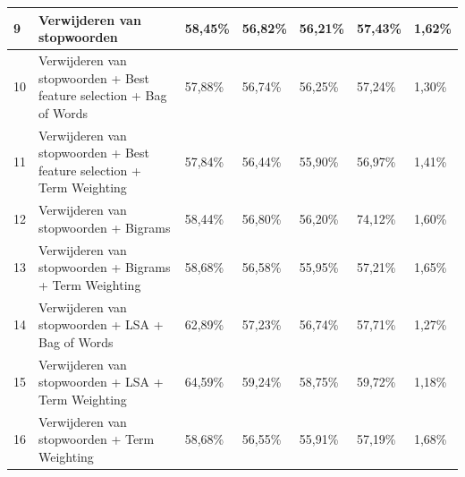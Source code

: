 \begin{table}
\begin{adjustbox}{width=1\textwidth}
\begin{tabular}{|l|l|l|l|l|l|l|}
9        & Verwijderen van stopwoorden                                                      & 58,45\%                     & 56,82\%                & 56,21\%                 & 57,43\%                  & 1,62\%      \\ \hline
10       & Verwijderen van stopwoorden + Best feature selection + Bag of Words   & 57,88\%                     & 56,74\%                & 56,25\%                 & 57,24\%                  & 1,30\%      \\ \hline
11       & Verwijderen van stopwoorden + Best feature selection + Term Weighting & 57,84\%                     & 56,44\%                & 55,90\%                 & 56,97\%                  & 1,41\%      \\ \hline
12       & Verwijderen van stopwoorden + Bigrams                                            & 58,44\%                     & 56,80\%                & 56,20\%                 & 74,12\%                  & 1,60\%      \\ \hline
13       & Verwijderen van stopwoorden + Bigrams + Term Weighting                           & 58,68\%                     & 56,58\%                & 55,95\%                 & 57,21\%                  & 1,65\%      \\ \hline
14       & Verwijderen van stopwoorden + LSA + Bag of Words                                 & 62,89\%                     & 57,23\%                & 56,74\%                 & 57,71\%                  & 1,27\%      \\ \hline
15       & Verwijderen van stopwoorden + LSA + Term Weighting                               & 64,59\%                     & 59,24\%                & 58,75\%                 & 59,72\%                  & 1,18\%      \\ \hline
16       & Verwijderen van stopwoorden + Term Weighting                                     & 58,68\%                     & 56,55\%                & 55,91\%                 & 57,19\%                  & 1,68\%      \\ \hline
\end{tabular}
\end{adjustbox}
\end{table}

